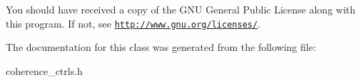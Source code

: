 You should have received a copy of the G\-N\-U General Public License along with this program. If not, see \href{http://www.gnu.org/licenses/}{\tt http\-://www.\-gnu.\-org/licenses/}. 

The documentation for this class was generated from the following file\-:\begin{DoxyCompactItemize}
\item 
coherence\-\_\-ctrls.\-h\end{DoxyCompactItemize}
